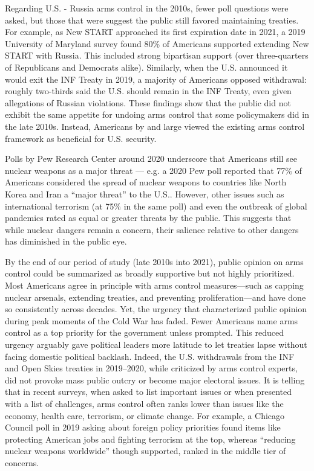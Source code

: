 \documentclass[11,5 pt]{article}
\begin{document}
    Regarding U.S. - Russia arms control in the 2010s, fewer poll questions were asked, but those that were suggest the public still favored maintaining treaties. For example, as New START approached its first expiration date in 2021, a 2019 University of Maryland survey found 80\% of Americans supported extending New START with Russia. This included strong bipartisan support (over three-quarters of Republicans and Democrats alike). Similarly, when the U.S. announced it would exit the INF Treaty in 2019, a majority of Americans opposed withdrawal: roughly two-thirds said the U.S. should remain in the INF Treaty, even given allegations of Russian violations. These findings show that the public did not exhibit the same appetite for undoing arms control that some policymakers did in the late 2010s. Instead, Americans by and large viewed the existing arms control framework as beneficial for U.S. security. 
    
    Polls by Pew Research Center around 2020 underscore that Americans still see nuclear weapons as a major threat — e.g. a 2020 Pew poll reported that 77\% of Americans considered the spread of nuclear weapons to countries like North Korea and Iran a “major threat” to the U.S.. However, other issues such as international terrorism (at 75\% in the same poll) and even the outbreak of global pandemics rated as equal or greater threats by the public. This suggests that while nuclear dangers remain a concern, their salience relative to other dangers has diminished in the public eye. 
    
    By the end of our period of study (late 2010s into 2021), public opinion on arms control could be summarized as broadly supportive but not highly prioritized. Most Americans agree in principle with arms control measures—such as capping nuclear arsenals, extending treaties, and preventing proliferation—and have done so consistently across decades. Yet, the urgency that characterized public opinion during peak moments of the Cold War has faded. Fewer Americans name arms control as a top priority for the government unless prompted. This reduced urgency arguably gave political leaders more latitude to let treaties lapse without facing domestic political backlash. Indeed, the U.S. withdrawals from the INF and Open Skies treaties in 2019–2020, while criticized by arms control experts, did not provoke mass public outcry or become major electoral issues. It is telling that in recent surveys, when asked to list important issues or when presented with a list of challenges, arms control often ranks lower than issues like the economy, health care, terrorism, or climate change. For example, a Chicago Council poll in 2019 asking about foreign policy priorities found items like protecting American jobs and fighting terrorism at the top, whereas “reducing nuclear weapons worldwide” though supported, ranked in the middle tier of concerns.
    
\end{document}

